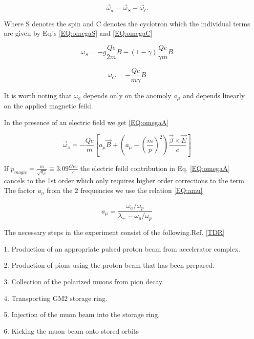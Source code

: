 \documentclass[./Thesis]{subfiles}
\begin{document}
	\begin{equation}
	\vec{\omega}_{a} = \vec{\omega}_{S} - \vec{\omega}_{C}
	\end{equation}

Where S denotes the spin and C denotes the cyclotron which the individual terms are given by Eq.'s \ref{EQ:omegaS} and \ref{EQ:omegaC}

	\begin{equation}\label{EQ:omegaS}
	\omega_{S} = -g \frac{Qe}{2m} B - (1-\gamma)\frac{Qe}{\gamma m} B
	\end{equation}

	\begin{equation}\label{EQ:omegaC}
	\omega_C = - \frac{Qe}{m\gamma} B
	\end{equation}

It is worth noting that $\omega_a$ depends only on the anomoly $a_\mu$ and depends linearly on the applied magnetic feild.

In the presence of an electric field we get \ref{EQ:omegaA}

\begin{equation}\label{EQ:omegaA}
\vec{\omega}_a = -\frac{Qe}{m}[a_{\mu} \vec{B} + (a_{\mu} - (\frac{m}{p})^2) \frac{\vec{\beta} \times \vec{E}}{c}]
\end{equation}


If $p_{magic} = \frac{m}{\sqrt{a_\mu}} \equiv 3.09 \frac{Gev}{c}$ the electric feild contribution in Eq. \ref{EQ:omegaA} cancels to the 1st order which only requires higher order corrections to the term. The factor $a_\mu$ from the 2 frequencies we use the relation \ref{EQ:amu}

\begin{equation}\label{EQ:amu}
a_\mu = \frac{\omega_a / \omega_p}{\lambda_{+} - \omega_a / \omega_p}
\end{equation}

The necessary steps in the experiment consist of the following.Ref. \ref{TDR}


1.	Production of an appropriate pulsed proton beam from accelerator complex.

2.	Production of pions using the proton beam that has been prepared.

3. 	Collection of the polarized muons from pion decay.

4.	Transporting GM2 storage ring.

5. 	Injection of the muon beam into the storage ring.

6. 	Kicking the muon beam onto stored orbits
\end{document}

